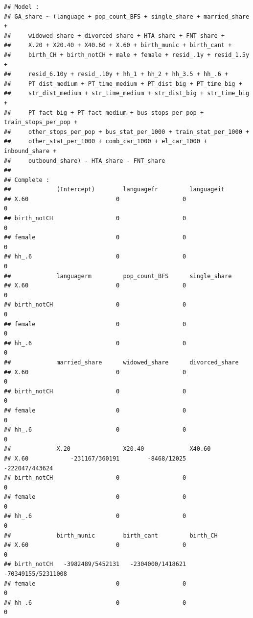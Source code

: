 \documentclass[
]{article}
\begin{document}
\begin{verbatim}
## Model :
## GA_share ~ (language + pop_count_BFS + single_share + married_share + 
##     widowed_share + divorced_share + HTA_share + FNT_share + 
##     X.20 + X20.40 + X40.60 + X.60 + birth_munic + birth_cant + 
##     birth_CH + birth_notCH + male + female + resid_.1y + resid_1.5y + 
##     resid_6.10y + resid_.10y + hh_1 + hh_2 + hh_3.5 + hh_.6 + 
##     PT_dist_medium + PT_time_medium + PT_dist_big + PT_time_big + 
##     str_dist_medium + str_time_medium + str_dist_big + str_time_big + 
##     PT_fact_big + PT_fact_medium + bus_stops_per_pop + train_stops_per_pop + 
##     other_stops_per_pop + bus_stat_per_1000 + train_stat_per_1000 + 
##     other_stat_per_1000 + comb_car_1000 + el_car_1000 + inbound_share + 
##     outbound_share) - HTA_share - FNT_share
## 
## Complete :
##             (Intercept)        languagefr         languageit        
## X.60                         0                  0                  0
## birth_notCH                  0                  0                  0
## female                       0                  0                  0
## hh_.6                        0                  0                  0
##             languagerm         pop_count_BFS      single_share      
## X.60                         0                  0                  0
## birth_notCH                  0                  0                  0
## female                       0                  0                  0
## hh_.6                        0                  0                  0
##             married_share      widowed_share      divorced_share    
## X.60                         0                  0                  0
## birth_notCH                  0                  0                  0
## female                       0                  0                  0
## hh_.6                        0                  0                  0
##             X.20               X20.40             X40.60            
## X.60            -231167/360191        -8468/12025     -222047/443624
## birth_notCH                  0                  0                  0
## female                       0                  0                  0
## hh_.6                        0                  0                  0
##             birth_munic        birth_cant         birth_CH          
## X.60                         0                  0                  0
## birth_notCH   -3982489/5452131   -2304000/1418621 -70349155/52311008
## female                       0                  0                  0
## hh_.6                        0                  0                  0

\end{verbatim}
\end{document}
